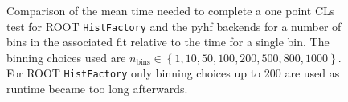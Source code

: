 \begin{figure}[htbp]
 \centering
 \hfil
 \hfil
 \caption{Comparison of the mean time needed to complete a one point CLs test for ROOT \texttt{HistFactory} and the pyhf backends for a number of bins in the associated fit relative to the time for a single bin.
  The binning choices used are $n_{\text{bins}} \in \left\{1, 10, 50, 100, 200, 500, 800, 1000\right\}$.
  For ROOT \texttt{HistFactory} only binning choices up to 200 are used as runtime became too long afterwards.
 }\label{fig:relative_time}
\end{figure}
